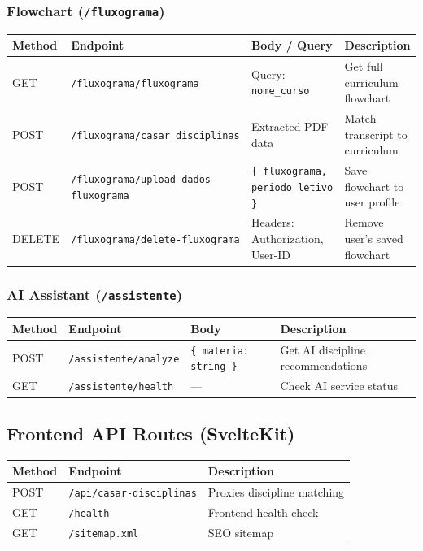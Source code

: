 \documentclass[11pt,a4paper]{article}
\newcommand{\code}[1]{\texttt{#1}}
\begin{document}
\subsubsection*{Flowchart (\code{/fluxograma})}
\begin{center}
\begin{longtable}{@{}L{1.5cm}L{4.5cm}L{3.5cm}L{3.5cm}@{}}
\toprule
\textbf{Method} & \textbf{Endpoint} & \textbf{Body / Query} & \textbf{Description} \\
\midrule
\endhead
GET    & \code{/fluxograma/fluxograma}             & Query: \code{nome\_curso}              & Get full curriculum flowchart \\
POST   & \code{/fluxograma/casar\_disciplinas}      & Extracted PDF data                    & Match transcript to curriculum \\
POST   & \code{/fluxograma/upload-dados-fluxograma} & \code{\{ fluxograma, periodo\_letivo \}} & Save flowchart to user profile \\
DELETE & \code{/fluxograma/delete-fluxograma}       & Headers: Authorization, User-ID       & Remove user's saved flowchart \\
\bottomrule
\end{longtable}
\end{center}

\subsubsection*{AI Assistant (\code{/assistente})}
\begin{center}
\begin{longtable}{@{}L{1.5cm}L{3.5cm}L{3.5cm}L{4cm}@{}}
\toprule
\textbf{Method} & \textbf{Endpoint} & \textbf{Body} & \textbf{Description} \\
\midrule
\endhead
POST & \code{/assistente/analyze} & \code{\{ materia: string \}} & Get AI discipline recommendations \\
GET  & \code{/assistente/health}  & ---                          & Check AI service status \\
\bottomrule
\end{longtable}
\end{center}

\subsection*{Frontend API Routes (SvelteKit)}
\begin{center}
\begin{longtable}{@{}L{1.5cm}L{4.5cm}L{6cm}@{}}
\toprule
\textbf{Method} & \textbf{Endpoint} & \textbf{Description} \\
\midrule
\endhead
POST & \code{/api/casar-disciplinas} & Proxies discipline matching \\
GET  & \code{/health}                & Frontend health check \\
GET  & \code{/sitemap.xml}           & SEO sitemap \\
\bottomrule
\end{longtable}
\end{center}
\end{document}
